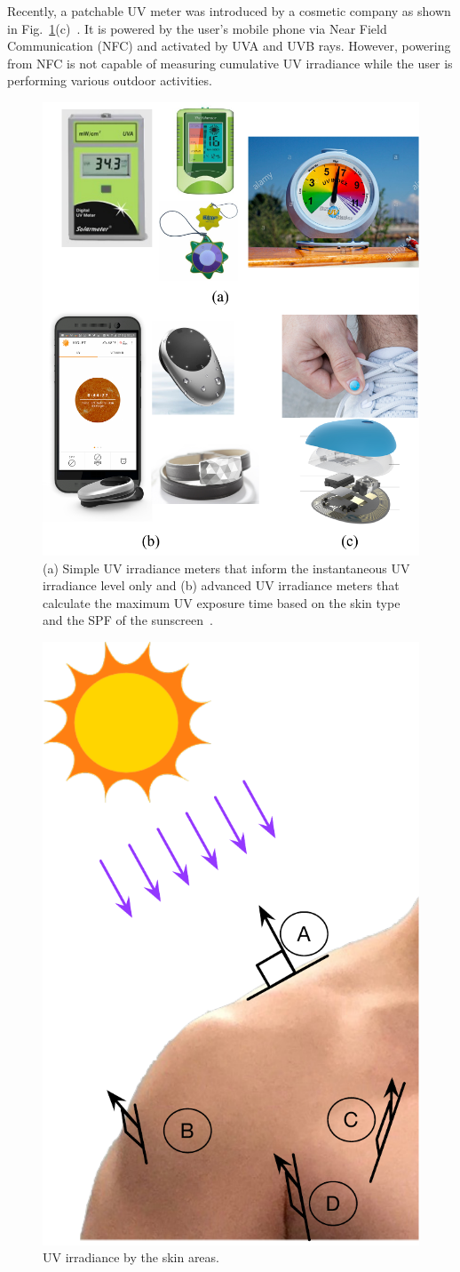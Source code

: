 \documentclass[journal]{IEEEtran}
\begin{document}
Recently, a patchable UV meter was introduced by a cosmetic company as shown in Fig.~\ref{fig:UVI_meters}(c)~\cite{LOreal}. It is powered by the user’s mobile phone via Near Field Communication (NFC) and activated by UVA and UVB rays. However, powering from NFC is not capable of measuring cumulative UV irradiance while the user is performing various outdoor activities. 

\begin{figure}
\centering
\includegraphics[width=0.8\hsize]{Figures/UVI_meter.pdf}
\caption{(a) Simple UV irradiance meters that inform the instantaneous UV irradiance level only and (b) advanced UV irradiance meters that calculate the maximum UV exposure time based on the skin type and the SPF of the sunscreen~\cite{Netatmo, Ultra, LOreal}.}
\label{fig:UVI_meters}
\end{figure}      

\begin{figure}
\centering
\includegraphics[width=0.4\hsize]{Figures/UV_skin_areas.pdf}
\caption{UV irradiance by the skin areas.}
\label{fig:UV_exposure_skin}
\end{figure}      
\end{document}
